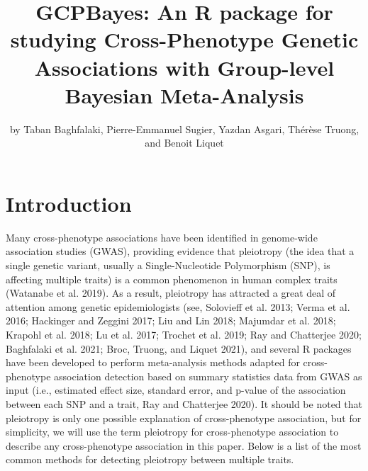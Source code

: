 \title{GCPBayes: An R package for studying Cross-Phenotype Genetic Associations with Group-level Bayesian Meta-Analysis}
\author{by Taban Baghfalaki, Pierre-Emmanuel Sugier, Yazdan Asgari, Thérèse Truong, and Benoit Liquet}

\maketitle


\hypertarget{introduction}{%
\section{Introduction}\label{introduction}}

Many cross-phenotype associations have been identified in genome-wide association studies (GWAS), providing evidence that pleiotropy (the idea that a single genetic variant, usually a Single-Nucleotide
Polymorphism (SNP), is affecting multiple traits) is a common phenomenon in human complex traits (Watanabe et al. 2019). As a result, pleiotropy has attracted a great deal of attention among genetic epidemiologists (see, Solovieff et al. 2013; Verma et al. 2016; Hackinger and Zeggini 2017; Liu and Lin 2018; Majumdar et al. 2018; Krapohl et al. 2018; Lu et al. 2017; Trochet et al. 2019; Ray and Chatterjee 2020; Baghfalaki et al. 2021; Broc, Truong, and Liquet 2021), and several R packages have been developed to perform meta-analysis methods adapted for cross-phenotype association detection based on summary statistics data from GWAS as input (i.e., estimated effect size, standard error, and p-value of the association between each SNP and a trait, Ray and Chatterjee 2020). It should be noted that pleiotropy is only one possible explanation of cross-phenotype association, but for simplicity, we will use the term pleiotropy for cross-phenotype association to describe any cross-phenotype association in this paper. Below is a list of the most common methods for detecting pleiotropy between multiple traits.

